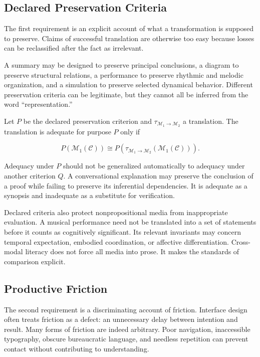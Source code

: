 \documentclass[11pt]{article}
\newcommand{\modality}{\mathcal{M}}
\newcommand{\contentobj}{\mathcal{C}}
\begin{document}
\subsection{Declared Preservation Criteria}

The first requirement is an explicit account of what a transformation is
supposed to preserve. Claims of successful translation are otherwise too
easy because losses can be reclassified after the fact as irrelevant.

A summary may be designed to preserve principal conclusions, a diagram to
preserve structural relations, a performance to preserve rhythmic and melodic
organization, and a simulation to preserve selected dynamical behavior.
Different preservation criteria can be legitimate, but they cannot all be
inferred from the word ``representation.''

Let \(P\) be the declared preservation criterion and
\(\tau_{\modality_1\rightarrow\modality_2}\) a translation. The translation is
adequate for purpose \(P\) only if

\begin{equation}
  P\!\left(\modality_1(\contentobj)\right)
  \cong
  P\!\left(
    \tau_{\modality_1\rightarrow\modality_2}
    (\modality_1(\contentobj))
  \right).
  \label{eq:declared-preservation}
\end{equation}

Adequacy under \(P\) should not be generalized automatically to adequacy under
another criterion \(Q\). A conversational explanation may preserve the
conclusion of a proof while failing to preserve its inferential dependencies.
It is adequate as a synopsis and inadequate as a substitute for verification.

Declared criteria also protect nonpropositional media from inappropriate
evaluation. A musical performance need not be translated into a set of
statements before it counts as cognitively significant. Its relevant
invariants may concern temporal expectation, embodied coordination, or
affective differentiation. Cross-modal literacy does not force all media into
prose. It makes the standards of comparison explicit.

\subsection{Productive Friction}

The second requirement is a discriminating account of friction. Interface
design often treats friction as a defect: an unnecessary delay between
intention and result. Many forms of friction are indeed arbitrary. Poor
navigation, inaccessible typography, obscure bureaucratic language, and
needless repetition can prevent contact without contributing to understanding.
\end{document}

